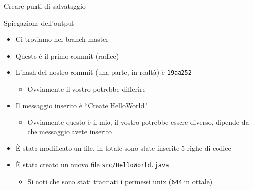 \documentclass[presentation]{beamer}
\begin{document}
\begin{frame}{Creare punti di salvataggio}
	\begin{block}{Spiegazione dell'output}
		\begin{itemize}
			\item Ci troviamo nel branch master
			\item Questo è il primo commit (radice)
			\item L'hash del nostro commit (una parte, in realtà) è \texttt{19aa252}
			\begin{itemize}
				\item Ovviamente il vostro potrebbe differire
			\end{itemize}
			\item Il messaggio inserito è ``Create HelloWorld''
			\begin{itemize}
				\item Ovviamente questo è il mio, il vostro potrebbe essere diverso, dipende da che messaggio avete inserito
			\end{itemize}
			\item È stato modificato un file, in totale sono state inserite 5 righe di codice
			\item È stato creato un nuovo file \texttt{src/HelloWorld.java}
			\begin{itemize}
				\item Si noti che sono stati tracciati i permessi unix (\texttt{644} in ottale)
			\end{itemize}
		\end{itemize}
	\end{block}
\end{frame}
\end{document}
